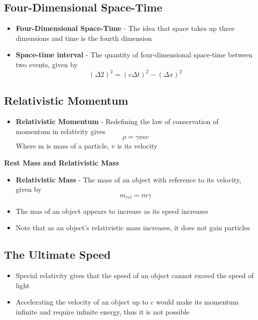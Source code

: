 \subsection{Four-Dimensional Space-Time}
\begin{itemize}
    \item \textbf{Four-Dimensional Space-Time} - The idea that space takes up three dimensions and time is the fourth dimension
    \item \textbf{Space-time interval} - The quantity of four-dimensional space-time between two events, given by \[(\Delta 2)^2=(c\Delta t)^2-(\Delta x)^2\]
\end{itemize}

\subsection{Relativistic Momentum}
\begin{itemize}
    \item \textbf{Relativistic Momentum} - Redefining the law of conservation of momentum in relativity gives \[\rho=\gamma mv\] Where m is mass of a particle, v is its velocity
\end{itemize}

\textbf{Rest Mass and Relativistic Mass}
\begin{itemize}
    \item \textbf{Relativistic Mass} - The mass of an object with reference to its velocity, given by \[m_{rel}=m\gamma\] 
    \item The mas of an object appears to increase as its speed increases
    \item Note that as an object's relativistic mass increases, it does not gain particles
\end{itemize}

\subsection{The Ultimate Speed}
\begin{itemize}
    \item Special relativity gives that the speed of an object cannot exceed the speed of light
    \item Accelerating the velocity of an object up to \(c\) would make its momentum infinite and require infinite energy, thus it is not possible
\end{itemize}

